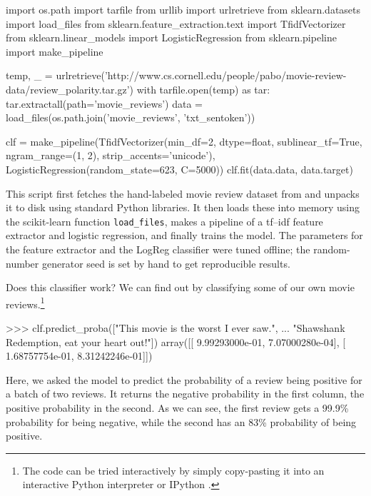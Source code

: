 \documentclass[a4paper]{article}
\begin{document}
\begin{pythoncode}
import os.path
import tarfile
from urllib import urlretrieve
from sklearn.datasets import load\_files
from sklearn.feature\_extraction.text import TfidfVectorizer
from sklearn.linear\_models import LogisticRegression
from sklearn.pipeline import make\_pipeline

temp, \_ = urlretrieve('http://www.cs.cornell.edu/people/pabo/movie-review-data/review\_polarity.tar.gz')
with tarfile.open(temp) as tar:
    tar.extractall(path='movie\_reviews')
data = load\_files(os.path.join('movie\_reviews', 'txt\_sentoken'))

clf = make\_pipeline(TfidfVectorizer(min\_df=2, dtype=float,
                                    sublinear\_tf=True, ngram\_range=(1, 2),
                                    strip\_accents='unicode'),
                     LogisticRegression(random\_state=623, C=5000))
clf.fit(data.data, data.target)
\end{pythoncode}

This script first fetches the hand-labeled movie review dataset from
\cite{pang2004} and unpacks it to disk using standard Python libraries.
It then loads these into memory using the scikit-learn function
\texttt{load\_files}, makes a pipeline of a \textsf{tf--idf} feature extractor
\cite{rennie2003tackling} and logistic regression,
and finally trains the model.
The parameters for the feature extractor and the LogReg classifier
were tuned offline; the random-number generator seed is set by hand
to get reproducible results.

Does this classifier work?
We can find out by classifying some of our own movie reviews.\footnote{
  The code can be tried interactively by simply copy-pasting it
  into an interactive Python interpreter or IPython \cite{perez2007ipython}.
}

\begin{pythoncode}
>>> clf.predict\_proba(["This movie is the worst I ever saw.",
...                    "Shawshank Redemption, eat your heart out!"])
array([[  9.99293000e-01,   7.07000280e-04],
       [  1.68757754e-01,   8.31242246e-01]])
\end{pythoncode}

Here, we asked the model to predict the probability of a review being positive
for a batch of two reviews. It returns the negative probability in the first
column, the positive probability in the second.
As we can see, the first review gets a 99.9\% probability for being negative,
while the second has an 83\% probability of being positive.
\end{document}
